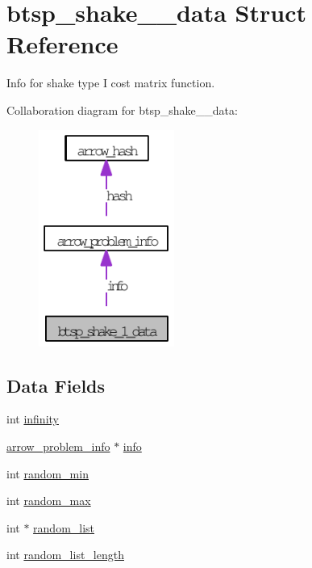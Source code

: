 \hypertarget{structbtsp__shake__1__data}{
\section{btsp\_\-shake\_\_\-data Struct Reference}
\label{structbtsp__shake__1__data}
}
Info for shake type I cost matrix function.  


Collaboration diagram for btsp\_\-shake\_\_\-data:\nopagebreak
\begin{figure}[H]
\begin{center}
\leavevmode
\includegraphics[width=126pt]{structbtsp__shake__1__data__coll__graph}
\end{center}
\end{figure}
\subsection*{Data Fields}
\begin{CompactItemize}
\item 
int \hyperlink{structbtsp__shake__1__data_61ef59ce5b0bb86d9b50b52a039de9db}{infinity}
\item 
\hyperlink{structarrow__problem__info}{arrow\_\-problem\_\-info} $\ast$ \hyperlink{structbtsp__shake__1__data_7d94d439381cbceadaa37f5da8504532}{info}
\item 
int \hyperlink{structbtsp__shake__1__data_5e5d65be36769726fdf5480d280cc6b8}{random\_\-min}
\item 
int \hyperlink{structbtsp__shake__1__data_bcc01769d35906588965943e759a7879}{random\_\-max}
\item 
int $\ast$ \hyperlink{structbtsp__shake__1__data_6f426a2ed61679a7b36b8dad28565c07}{random\_\-list}
\item 
int \hyperlink{structbtsp__shake__1__data_ef9f8c49e26ffcd108f67fc035c6e478}{random\_\-list\_\-length}
\end{CompactItemize}



